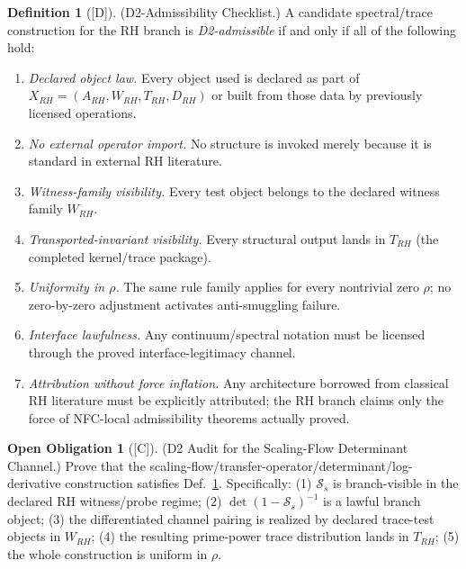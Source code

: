 \documentclass[12pt,oneside]{amsbook}
\theoremstyle{plain}
\theoremstyle{definition}
\newtheorem{definition}[theorem]{Definition}
\newtheorem{obligation}[theorem]{Open Obligation}
\theoremstyle{remark}
\newcommand{\status}[1]{\textup{[#1]}}
\begin{document}
\begin{definition}[\status{D}]\label{def:rh-d2-checklist}
\textup{(D2-Admissibility Checklist.)}
A candidate spectral/trace construction for the RH branch is
\emph{D2-admissible} if and only if all of the following hold:
\begin{enumerate}[label=\textup{(\arabic*)}]
 \item \emph{Declared object law.} Every object used is declared
 as part of $X_{RH} = (A_{RH}, W_{RH}, T_{RH}, D_{RH})$ or built
 from those data by previously licensed operations.
 \item \emph{No external operator import.} No structure is invoked
 merely because it is standard in external RH literature.
 \item \emph{Witness-family visibility.} Every test object belongs
 to the declared witness family $W_{RH}$.
 \item \emph{Transported-invariant visibility.} Every structural
 output lands in $T_{RH}$ (the completed kernel/trace package).
 \item \emph{Uniformity in $\rho$.} The same rule family applies
 for every nontrivial zero $\rho$; no zero-by-zero adjustment
 activates anti-smuggling failure.
 \item \emph{Interface lawfulness.} Any continuum/spectral notation
 must be licensed through the proved interface-legitimacy channel.
 \item \emph{Attribution without force inflation.} Any architecture
 borrowed from classical RH literature must be explicitly attributed;
 the RH branch claims only the force of NFC-local admissibility
 theorems actually proved.
\end{enumerate}
\end{definition}

\begin{obligation}[\status{C}]\label{ob:rh-sf-d2-audit}
\textup{(D2 Audit for the Scaling-Flow Determinant Channel.)}
Prove that the scaling-flow/transfer-operator/determinant/log-derivative
construction satisfies Def.~\ref{def:rh-d2-checklist}. Specifically:
(1) $\mathcal{S}_s$ is branch-visible in the declared RH witness/probe
regime; (2) $\det(1-\mathcal{S}_s)^{-1}$ is a lawful branch object;
(3) the differentiated channel pairing is realized by declared
trace-test objects in $W_{RH}$; (4) the resulting prime-power trace
distribution lands in $T_{RH}$; (5) the whole construction is uniform
in $\rho$.
\end{obligation}
\end{document}
